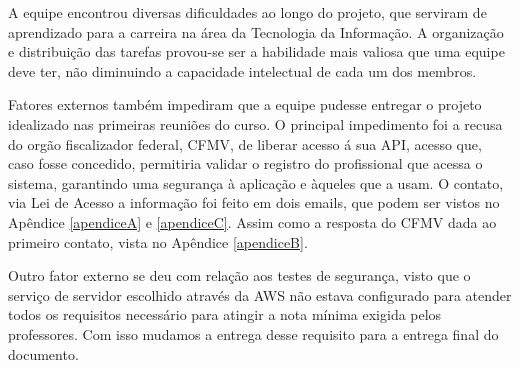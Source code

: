 \documentclass[
    12pt,               %
    openright,          %
    oneside,
    a4paper,            %
    BIBLATEX,           %
    TODO,               %
    english,            %
    brazil              %
    ]{ifsp-spo-inf-ctds}
\begin{document}
    A equipe encontrou diversas dificuldades ao longo do projeto, que serviram de aprendizado para a carreira na área da Tecnologia da Informação.
    A organização e distribuição das tarefas provou-se ser a habilidade mais valiosa que uma equipe deve ter, não diminuindo a capacidade intelectual de cada um dos membros. 
    
    Fatores externos também impediram que a equipe pudesse entregar o projeto idealizado nas primeiras reuniões do curso. O principal impedimento foi a recusa do orgão fiscalizador federal, CFMV, de liberar acesso á sua API, acesso que, caso fosse concedido, permitiria validar o registro do profissional que acessa o sistema, garantindo uma segurança à aplicação e àqueles que a usam. O contato, via Lei de Acesso a informação foi feito em dois emails, que podem ser vistos no Apêndice \ref{apendiceA}  e \ref{apendiceC}. Assim como a resposta do CFMV dada ao primeiro contato, vista no Apêndice \ref{apendiceB}.
    
    Outro fator externo se deu com relação aos testes de segurança, visto que o serviço de servidor escolhido através da AWS não estava configurado para atender todos os requisitos necessário para atingir a nota mínima exigida pelos professores. Com isso mudamos a entrega desse requisito para a entrega final do documento.
        



\postextual


%






\end{document}
